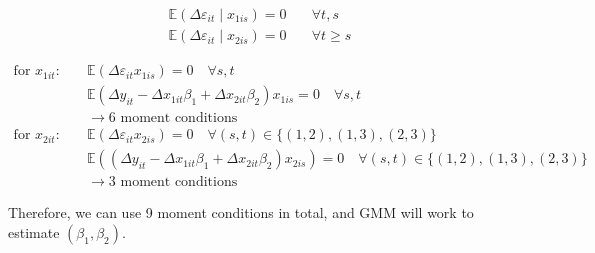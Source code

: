 {{$$
\begin{aligned}
\mathbb{E}\left(\Delta \varepsilon_{i t} \mid x_{1is}\right)=0 & \quad \forall t,s \\
\mathbb{E}\left(\Delta \varepsilon_{i t} \mid x_{2 i s}\right)=0 & \quad \forall t \geq s
\end{aligned}
$$

$$
\begin{aligned}
\text{for }x_{1 i t}: \quad & \mathbb{E}\left(\Delta \varepsilon_{i t} x_{1 i s}\right)=0 \quad \forall s, t \\
&\mathbb{E}\left(\Delta y_{i t}-\Delta x_{1i t} \beta_{1}+\Delta x_{2 it} \beta_{2}\right) x_{1 i s}=0 \quad \forall s, t \\
&\longrightarrow 6 \text{ moment conditions} \\
\text{for }x_{2 i t}: \quad & \mathbb{E}\left(\Delta \varepsilon_{i t} x_{2is}\right)=0 \quad \forall (s, t) \in\{(1,2),(1,3),(2,3)\} \\
&\mathbb{E}\left(\left(\Delta y_{i t}-\Delta x_{1 i t} \beta_{1}+\Delta x_{2i t} \beta_{2}\right) x_{2 i s}\right)=0 \quad \forall (s, t) \in\{(1,2),(1,3),(2,3)\} \\
&\longrightarrow 3 \text{ moment conditions}
\end{aligned}
$$

Therefore, we can use 9 moment conditions in total, and GMM will work to estimate $\left(\beta_{1}, \beta_{2}\right)$.
}
}
